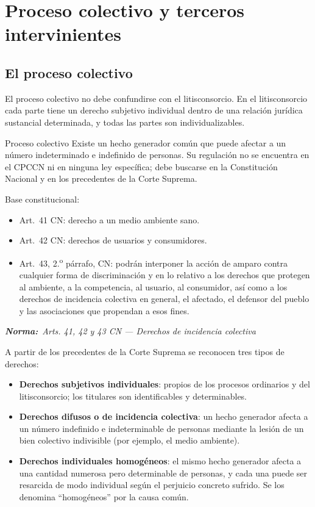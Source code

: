 \documentclass[12pt,oneside]{book}
\newcommand{\normaref}[1]{%
    \par\noindent\textbf{\textit{Norma:}}~\textit{#1}\par\vspace{0.2em}
}
\begin{document}
\chapter{Proceso colectivo y terceros intervinientes}

\section{El proceso colectivo}

El proceso colectivo no debe confundirse con el litisconsorcio. En el litisconsorcio cada parte tiene un derecho subjetivo individual dentro de una relación jurídica sustancial determinada, y todas las partes son individualizables.

\begin{definition}{Proceso colectivo}
Existe un hecho generador común que puede afectar a un número indeterminado e indefinido de personas. Su regulación no se encuentra en el CPCCN ni en ninguna ley específica; debe buscarse en la Constitución Nacional y en los precedentes de la Corte Suprema.
\end{definition}

Base constitucional:

\begin{itemize}
    \item Art.\ 41 CN: derecho a un medio ambiente sano.
    \item Art.\ 42 CN: derechos de usuarios y consumidores.
    \item Art.\ 43, 2.\textsuperscript{o} párrafo, CN: podrán interponer la acción de amparo contra cualquier forma de discriminación y en lo relativo a los derechos que protegen al ambiente, a la competencia, al usuario, al consumidor, así como a los derechos de incidencia colectiva en general, el afectado, el defensor del pueblo y las asociaciones que propendan a esos fines.
\end{itemize}

\normaref{Arts. 41, 42 y 43 CN --- Derechos de incidencia colectiva}

A partir de los precedentes de la Corte Suprema se reconocen tres tipos de derechos:

\begin{itemize}
    \item \textbf{Derechos subjetivos individuales}: propios de los procesos ordinarios y del litisconsorcio; los titulares son identificables y determinables.
    \item \textbf{Derechos difusos o de incidencia colectiva}: un hecho generador afecta a un número indefinido e indeterminable de personas mediante la lesión de un bien colectivo indivisible (por ejemplo, el medio ambiente).
    \item \textbf{Derechos individuales homogéneos}: el mismo hecho generador afecta a una cantidad numerosa pero determinable de personas, y cada una puede ser resarcida de modo individual según el perjuicio concreto sufrido. Se los denomina ``homogéneos'' por la causa común.
\end{itemize}
\end{document}
